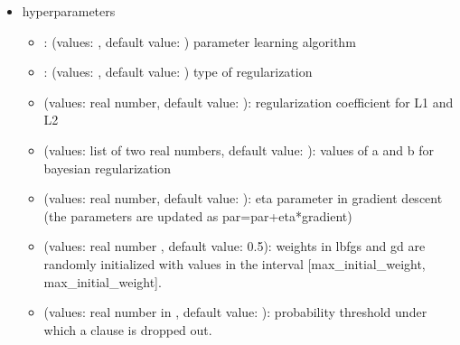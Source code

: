 \documentclass[letterpaper,10pt,english]{sphinxmanual}
\begin{document}
\begin{sphinxVerbatim}[commandchars=\\\{\}]
 
\end{sphinxVerbatim}
\begin{itemize}
\item {} 
\sphinxAtStartPar
hyper\sphinxhyphen{}parameters
\begin{itemize}
\item {} 
\sphinxAtStartPar
{}: (values: , default value: ) parameter learning algorithm

\item {} 
\sphinxAtStartPar
{}: (values: , default value: ) type of regularization

\item {} 
\sphinxAtStartPar
{} (values: real number, default value: ): regularization coefficient for L1 and L2

\item {} 
\sphinxAtStartPar
{} (values: list of two real numbers, default value: \sphinxcode{\sphinxupquote{{[}0,10{]}}}): values of a and b for bayesian regularization

\item {} 
\sphinxAtStartPar
{} (values: real number, default value: ): eta parameter in gradient descent (the parameters are updated as par=par+eta*gradient)

\item {} 
\sphinxAtStartPar
{} (values: real number , default value: 0.5): weights in lbfgs and gd are randomly initialized with values in the interval {[}\sphinxhyphen{}max\_initial\_weight, max\_initial\_weight{]}.

\item {} 
\sphinxAtStartPar
{} (values: real number in \sphinxcode{\sphinxupquote{{[}0,1{]}}}, default value: ):  probability threshold under which a clause is dropped out.


\end{itemize}
\end{itemize}
\end{document}
